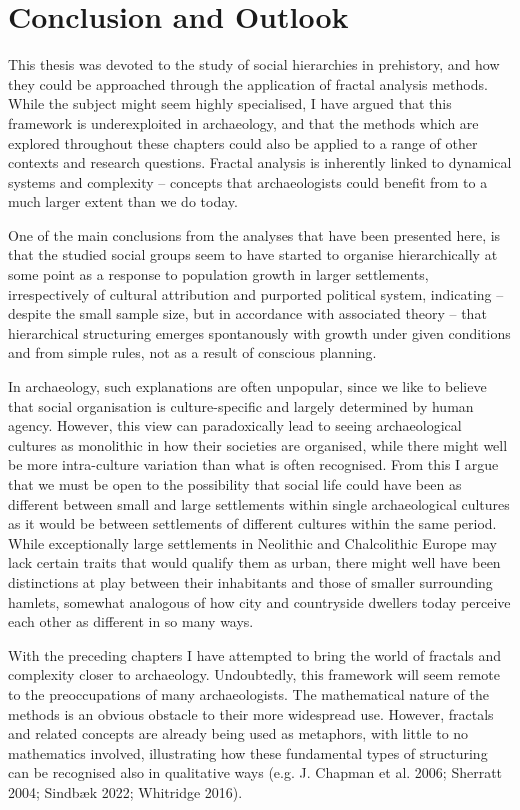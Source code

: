 \documentclass[
  12pt,
  a4paper, twoside]{book}
\begin{document}
\hypertarget{conclusion}{%
\chapter{Conclusion and Outlook}\label{conclusion}}

This thesis was devoted to the study of social hierarchies in prehistory, and how they could be approached through the application of fractal analysis methods. While the subject might seem highly specialised, I have argued that this framework is underexploited in archaeology, and that the methods which are explored throughout these chapters could also be applied to a range of other contexts and research questions. Fractal analysis is inherently linked to dynamical systems and complexity -- concepts that archaeologists could benefit from to a much larger extent than we do today.

One of the main conclusions from the analyses that have been presented here, is that the studied social groups seem to have started to organise hierarchically at some point as a response to population growth in larger settlements, irrespectively of cultural attribution and purported political system, indicating -- despite the small sample size, but in accordance with associated theory -- that hierarchical structuring emerges spontanously with growth under given conditions and from simple rules, not as a result of conscious planning.

In archaeology, such explanations are often unpopular, since we like to believe that social organisation is culture-specific and largely determined by human agency. However, this view can paradoxically lead to seeing archaeological cultures as monolithic in how their societies are organised, while there might well be more intra-culture variation than what is often recognised. From this I argue that we must be open to the possibility that social life could have been as different between small and large settlements within single archaeological cultures as it would be between settlements of different cultures within the same period. While exceptionally large settlements in Neolithic and Chalcolithic Europe may lack certain traits that would qualify them as urban, there might well have been distinctions at play between their inhabitants and those of smaller surrounding hamlets, somewhat analogous of how city and countryside dwellers today perceive each other as different in so many ways.

With the preceding chapters I have attempted to bring the world of fractals and complexity closer to archaeology. Undoubtedly, this framework will seem remote to the preoccupations of many archaeologists. The mathematical nature of the methods is an obvious obstacle to their more widespread use. However, fractals and related concepts are already being used as metaphors, with little to no mathematics involved, illustrating how these fundamental types of structuring can be recognised also in qualitative ways (e.g. J. Chapman et al. 2006; Sherratt 2004; Sindbæk 2022; Whitridge 2016).
\end{document}
